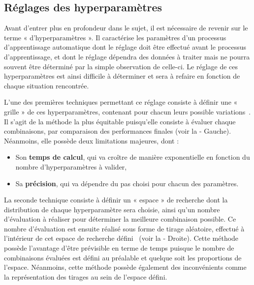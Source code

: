 \subsection{Réglages des hyperparamètres}
\label{subsec:hyperparameter}
Avant d’entrer plus en profondeur dans le sujet, il est nécessaire de revenir sur le terme « d’hyperparamètres ». Il caractérise les paramètres d'un processus d'apprentissage automatique dont le réglage doit être effectué avant le processus d’apprentissage, et dont le réglage dépendra des données à traiter mais ne pourra souvent être déterminé par la simple observation de celle-ci. Le réglage de ces hyperparamètres est ainsi difficile à déterminer et sera à refaire en fonction de chaque situation rencontrée.\par

L’une des premières techniques permettant ce réglage consiste à définir une « grille » de ces hyperparamètres, contenant pour chacun leurs possible variations~\cite{Liu2006}. Il s'agit de la méthode la plus équitable puisqu'elle consiste à évaluer chaque combinaisons, par comparaison des performances finales (voir la  - Gauche). Néanmoins, elle possède deux limitations majeures, dont :
\begin{itemize}
    \item Son \textbf{temps de calcul}, qui va croître de manière exponentielle en fonction du nombre d'hyperparamètres à valider,
    \item Sa \textbf{précision}, qui va dépendre du pas choisi pour chacun des paramètres.
\end{itemize}\par

La seconde technique consiste à définir un « espace » de recherche dont la distribution de chaque hyperparamètre sera choisie, ainsi qu'un nombre d'évaluation à réaliser pour déterminer la meilleure combinaison possible. Ce nombre d'évaluation est ensuite réalisé sous forme de tirage aléatoire, effectué à l'intérieur de cet espace de recherche défini~\cite{bergstra2012} (voir la  - Droite). Cette méthode possède l'avantage d'être prévisible en terme de temps puisque le nombre de combinaisons évaluées est défini au préalable et quelque soit les proportions de l'espace. Néanmoins, cette méthode possède également des inconvénients comme la représentation des tirages au sein de l'espace défini.

